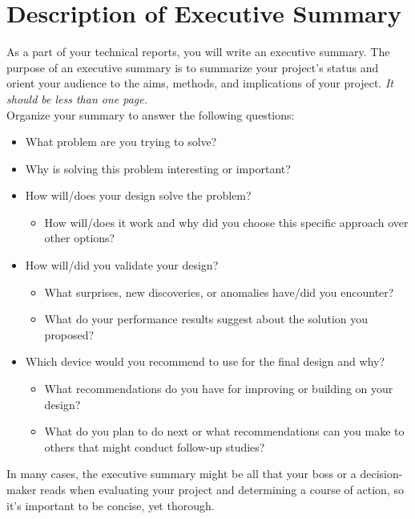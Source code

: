 \documentclass{article}
\begin{document}
\pagebreak

\section*{Description of Executive Summary}
As a part of your technical reports, you will write an executive summary. The purpose of an executive summary is to summarize your project’s status and orient your audience to the aims, methods, and implications of your project. \textit{It should be less than one page.}\\

Organize your summary to answer the following questions:
\begin{itemize}
	\item What problem are you trying to solve?
	\item Why is solving this problem interesting or important?
	\item How will/does your design solve the problem?
	\begin{itemize}
		\item How will/does it work and why did you choose this specific approach over other options?
	\end{itemize}
	\item How will/did you validate your design?
	\begin{itemize}
		\item What surprises, new discoveries, or anomalies have/did you encounter?
		\item What do your performance results suggest about the solution you proposed?
	\end{itemize}
	\item Which device would you recommend to use for the final design and why?
	\begin{itemize}
		\item What recommendations do you have for improving or building on your design?
		\item What do you plan to do next or what recommendations can you make to others that might conduct follow-up studies?
	\end{itemize}
\end{itemize}

In many cases, the executive summary might be all that your boss or a decision-maker reads when evaluating your project and determining a course of action, so it’s important to be concise, yet thorough.
\end{document}
